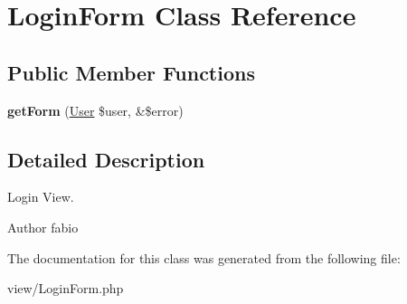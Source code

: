 \hypertarget{classLoginForm}{\section{Login\+Form Class Reference}
\label{classLoginForm}
}
\subsection*{Public Member Functions}
\begin{DoxyCompactItemize}
\item 
\hypertarget{classLoginForm_af84f923c24f3be4056a7a0a752404191}{{\bfseries get\+Form} (\hyperlink{classUser}{User} \$user, \&\$error)}\label{classLoginForm_af84f923c24f3be4056a7a0a752404191}

\end{DoxyCompactItemize}


\subsection{Detailed Description}
Login View.

\begin{DoxyAuthor}{Author}
fabio 
\end{DoxyAuthor}


The documentation for this class was generated from the following file\+:\begin{DoxyCompactItemize}
\item 
view/Login\+Form.\+php\end{DoxyCompactItemize}
